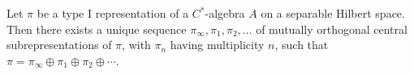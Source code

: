 Let $\pi$ be a type I representation of a $C^*$-algebra $A$ on a separable Hilbert space. Then there exists a unique sequence $\pi_\infty, \pi_1, \pi_2, \ldots$ of mutually orthogonal central subrepresentations of $\pi$, with $\pi_n$ having multiplicity $n$, such that $\pi = \pi_\infty \oplus \pi_1 \oplus \pi_2 \oplus \cdots$.
